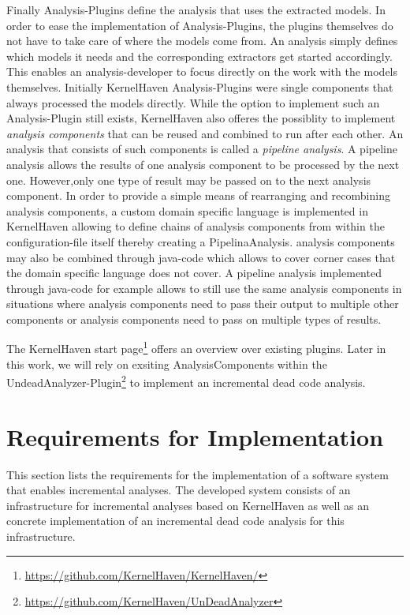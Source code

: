 \documentclass[a4paper]{article}
\begin{document}
Finally Analysis-Plugins define the analysis that uses the extracted models. In order to ease the implementation of Analysis-Plugins, the plugins themselves do not have to take care of where the models come from. An analysis simply defines which models it needs and the corresponding extractors get started accordingly. This enables an analysis-developer to focus directly on the work with the models themselves. Initially KernelHaven Analysis-Plugins  were single components that always processed the models directly. While the option to implement such an Analysis-Plugin still exists, KernelHaven also offeres the possiblity to implement \emph{analysis components} that can be reused and combined to run after each other. An analysis that consists of such components is called a \emph{pipeline analysis}. A pipeline analysis allows the results of one analysis component to be processed by the next one.  However,only one type of result may be passed on to the next analysis component. In order to provide a simple means of rearranging and recombining analysis components, a custom domain specific language is implemented in KernelHaven allowing to define chains of analysis components from within the configuration-file itself thereby creating a PipelinaAnalysis. analysis components may also be combined through java-code which allows to cover corner cases that the domain specific language does not cover. A pipeline analysis implemented through java-code for example allows to still use the same analysis components in situations where  analysis components need to pass their output to multiple other components or analysis components need to pass on multiple types of results.

The KernelHaven start page\footnote{\url{https://github.com/KernelHaven/KernelHaven/}} offers an overview over existing plugins. Later in this work, we will rely on exsiting AnalysisComponents within the UndeadAnalyzer-Plugin\footnote{\url{https://github.com/KernelHaven/UnDeadAnalyzer}} to implement an incremental dead code analysis. 

\newpage
\section{Requirements for Implementation} \label{requirements}

This section lists the requirements for the implementation of a software system that enables incremental analyses. The developed system consists of an infrastructure for incremental analyses based on KernelHaven as well as an concrete implementation of an incremental dead code analysis for this infrastructure.
\end{document}
